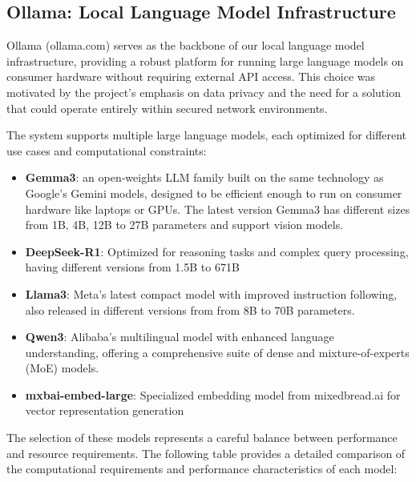 \documentclass[12pt,letterpaper]{article}
\begin{document}
\subsection{Ollama: Local Language Model Infrastructure}
\label{sec:ollama}

Ollama (ollama.com) serves as the backbone of our local language model infrastructure, providing a robust platform for running large language models on consumer hardware without requiring external API access. This choice was motivated by the project's emphasis on data privacy and the need for a solution that could operate entirely within secured network environments.

The system supports multiple large language models, each optimized for different use cases and computational constraints:

\begin{itemize}
    \item \textbf{Gemma3}: an open‑weights LLM family built on the same technology as Google’s Gemini models, designed to be efficient enough to run on consumer hardware like laptops or GPUs. The latest version Gemma3 has different sizes from 1B, 4B, 12B to 27B parameters and support vision models.
    \item \textbf{DeepSeek-R1}: Optimized for reasoning tasks and complex query processing, having different versions from 1.5B to 671B
    \item \textbf{Llama3}: Meta's latest compact model with improved instruction following, also released in different versions from from 8B to 70B parameters.
    \item \textbf{Qwen3}: Alibaba's multilingual model with enhanced language understanding, offering a comprehensive suite of dense and mixture-of-experts (MoE) models.
    \item \textbf{mxbai-embed-large}: Specialized embedding model from mixedbread.ai for vector representation generation
\end{itemize}

The selection of these models represents a careful balance between performance and resource requirements. The following table provides a detailed comparison of the computational requirements and performance characteristics of each model:
\end{document}
